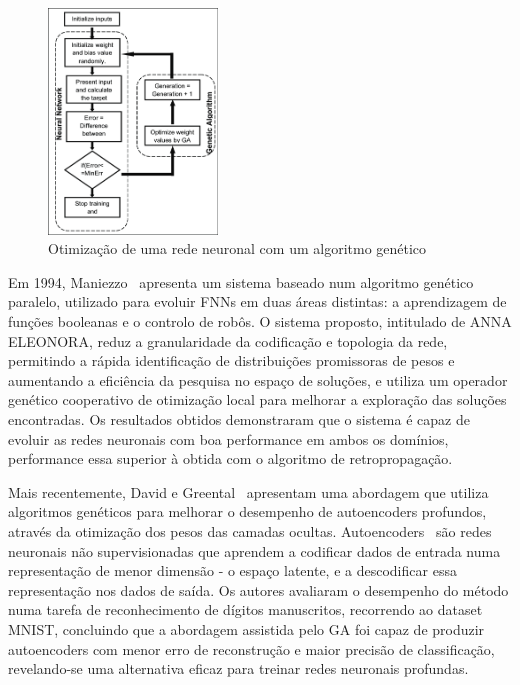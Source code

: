 \documentclass[conference]{IEEEtran}
\begin{document}
\begin{figure}[htbp]
    \centering
    \includegraphics[width=0.4\textwidth]{imagens/ga_nn.png}
    \caption{Otimização de uma rede neuronal com um algoritmo genético~\cite{Rahman2015AnAlgorithms}}
    \label{fig:ga_nn}
\end{figure}

Em 1994, Maniezzo~\cite{Maniezzo1994} apresenta um sistema baseado num algoritmo genético paralelo, utilizado para evoluir FNNs em duas áreas distintas: a aprendizagem de funções booleanas e o controlo de robôs. O sistema proposto, intitulado de ANNA ELEONORA, reduz a granularidade da codificação e topologia da rede, permitindo a rápida identificação de distribuições promissoras de pesos e aumentando a eficiência da pesquisa no espaço de soluções, e utiliza um operador genético cooperativo de otimização local para melhorar a exploração das soluções encontradas. Os resultados obtidos demonstraram que o sistema é capaz de evoluir as redes neuronais com boa performance em ambos os domínios, performance essa superior à obtida com o algoritmo de retropropagação.

Mais recentemente, David e Greental~\cite{David2014GeneticNetworks} apresentam uma abordagem que utiliza algoritmos genéticos para melhorar o desempenho de autoencoders profundos, através da otimização dos pesos das camadas ocultas. Autoencoders~\cite{Pierre2011} são redes neuronais não supervisionadas que aprendem a codificar dados de entrada numa representação de menor dimensão - o espaço latente, e a descodificar essa representação nos dados de saída. Os autores avaliaram o desempenho do método numa tarefa de reconhecimento de dígitos manuscritos, recorrendo ao dataset MNIST, concluindo que a abordagem assistida pelo GA foi capaz de produzir autoencoders com menor erro de reconstrução e maior precisão de classificação, revelando-se uma alternativa eficaz para treinar redes neuronais profundas.
\end{document}
